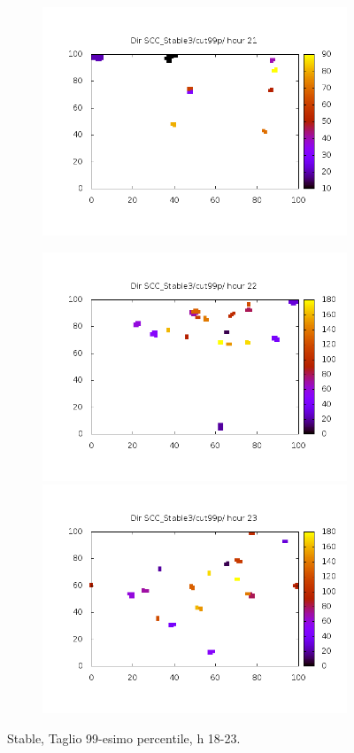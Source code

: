 \documentclass[10pt,a4paper]{article}
\begin{document}
\begin{figure}
\begin{subfigure}[b]{1\textwidth}
\includegraphics[scale=.4]{./img/SCC_Stable3/cut99p/21.png}
\end{subfigure}
\begin{subfigure}[b]{1\textwidth}
\includegraphics[scale=.4]{./img/SCC_Stable3/cut99p/22.png}
\includegraphics[scale=.4]{./img/SCC_Stable3/cut99p/23.png}
\end{subfigure}
\caption{Stable, Taglio 99-esimo percentile, h 18-23.}
\label{stable-99-1823}
\end{figure}
\end{document}
